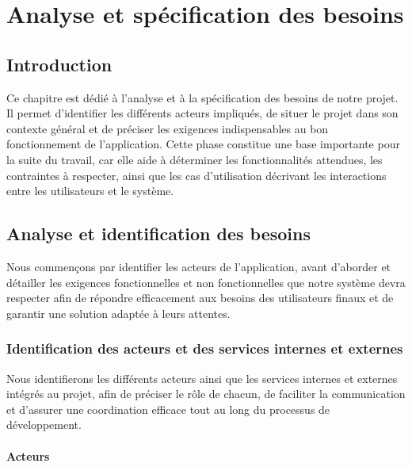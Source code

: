 \documentclass[12pt,a4paper]{report}
\begin{document}
\chapter{Analyse et spécification des besoins}
\section{Introduction}
\justify
Ce chapitre est dédié à l'analyse et à la spécification des besoins de notre projet. Il permet d'identifier les différents acteurs impliqués, de situer le projet dans son contexte général et de préciser les exigences indispensables au bon fonctionnement de l'application. Cette phase constitue une base importante pour la suite du travail, car elle aide à déterminer les fonctionnalités attendues, les contraintes à respecter, ainsi que les cas d'utilisation décrivant les interactions entre les utilisateurs et le système.

\section{Analyse et identification des besoins}
Nous commençons par identifier les acteurs de l'application, avant d'aborder et détailler les exigences fonctionnelles et non fonctionnelles que notre système devra respecter afin de répondre efficacement aux besoins des utilisateurs finaux et de garantir une solution adaptée à leurs attentes.

\subsection{Identification des acteurs et des services internes et externes}
Nous identifierons les différents acteurs ainsi que les services internes et externes intégrés au projet, afin de préciser le rôle de chacun, de faciliter la communication et d'assurer une coordination efficace tout au long du processus de développement.

\subsubsection{Acteurs }
\end{document}
